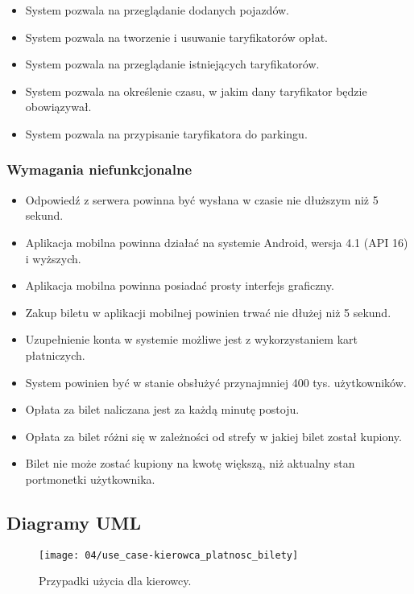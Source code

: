 \begin{enumerate}
\begin{itemize}
			\item System pozwala na przeglądanie dodanych pojazdów.
			\item System pozwala na tworzenie i usuwanie taryfikatorów opłat.
			\item System pozwala na przeglądanie istniejących taryfikatorów.
			\item System pozwala na określenie czasu, w jakim dany taryfikator będzie obowiązywał.
			\item System pozwala na przypisanie taryfikatora do parkingu.
		\end{itemize}
\end{enumerate}

\subsubsection*{Wymagania niefunkcjonalne}

\begin{itemize}
	\item Odpowiedź z serwera powinna być wysłana w czasie nie dłuższym niż 5 sekund.
	\item Aplikacja mobilna powinna działać na systemie Android, wersja 4.1 (API 16) i wyższych.
	\item Aplikacja mobilna powinna posiadać prosty interfejs graficzny.
	\item Zakup biletu w aplikacji mobilnej powinien trwać nie dłużej niż 5 sekund.
	\item Uzupełnienie konta w systemie możliwe jest z wykorzystaniem kart płatniczych.
	\item System powinien być w stanie obsłużyć przynajmniej 400 tys. użytkowników.
	\item Opłata za bilet naliczana jest za każdą minutę postoju.
	\item Opłata za bilet różni się w zależności od strefy w jakiej bilet został kupiony.
	\item Bilet nie może zostać kupiony na kwotę większą, niż aktualny stan portmonetki użytkownika. 
\end{itemize}

\newpage
\subsection{Diagramy UML}

\begin{figure}[h]
	\begin{center}
		\texttt{[image: 04/use\_case-kierowca\_platnosc\_bilety]}
	\end{center}
	\caption{Przypadki użycia dla kierowcy.}
\end{figure}

